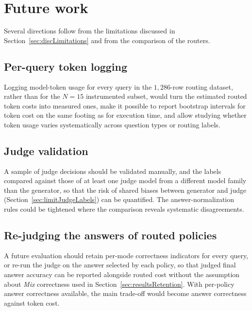 \documentclass[english, bibtex]{kththesis}               %
\numberwithin{listing}{chapter}
\begin{document}
\section{Future work}
\label{sec:futureWork}

Several directions follow from the limitations discussed in Section~\ref{sec:discLimitations} and from the comparison of the routers.

\subsection{Per-query token logging} Logging model-token usage for every query in the $1{,}286$-row routing dataset, rather than for the $N = 15$ instrumented subset, would turn the estimated routed token costs into measured ones, make it possible to report bootstrap intervals for token cost on the same footing as for execution time, and allow studying whether token usage varies systematically across question types or routing labels.

\subsection{Judge validation} A sample of judge decisions should be validated manually, and the labels compared against those of at least one judge model from a different model family than the generator, so that the risk of shared biases between generator and judge (Section~\ref{sec:limitJudgeLabels}) can be quantified. The answer-normalization rules could be tightened where the comparison reveals systematic disagreements.

\subsection{Re-judging the answers of routed policies} A future evaluation should retain per-mode correctness indicators for every query, or re-run the judge on the answer selected by each policy, so that judged final answer accuracy can be reported alongside routed cost without the assumption about \emph{Mix} correctness used in Section~\ref{sec:resultsRetention}. With per-policy answer correctness available, the main trade-off would become answer correctness against token cost.
\end{document}
